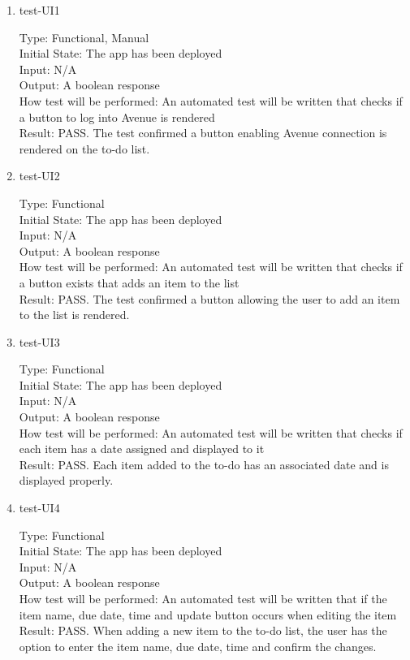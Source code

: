 \documentclass[12pt, titlepage]{article}
\begin{document}
\begin{enumerate}
\item{test-UI1\\}

Type: Functional, Manual\\
Initial State: The app has been deployed\\
Input: N/A\\
Output: A boolean response\\
How test will be performed: An automated test will be written that checks if a button to log into Avenue is rendered\\
Result: PASS. The test confirmed a button enabling Avenue connection is rendered on the to-do list.

\item{test-UI2\\}

Type: Functional\\
Initial State: The app has been deployed\\
Input: N/A\\
Output: A boolean response\\
How test will be performed: An automated test will be written that checks if a button exists that adds an item to the list\\
Result: PASS. The test confirmed a button allowing the user to add an item to the list is rendered.

\item{test-UI3\\}

Type: Functional\\
Initial State: The app has been deployed\\
Input: N/A\\
Output: A boolean response\\
How test will be performed: An automated test will be written that checks if each item has a date assigned and displayed to it\\
Result: PASS. Each item added to the to-do has an associated date and is displayed properly.

\item{test-UI4\\}

Type: Functional\\
Initial State: The app has been deployed\\
Input: N/A\\
Output: A boolean response\\
How test will be performed: An automated test will be written that if the item name, due date, time and update button occurs when editing the item\\
Result: PASS. When adding a new item to the to-do list, the user has the option to enter the item name, due date, time and confirm the changes.


\end{enumerate}
\end{document}
